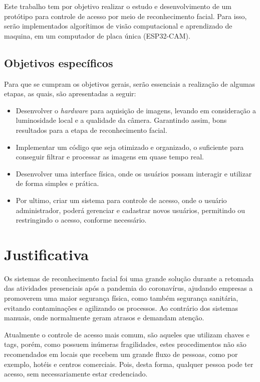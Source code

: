 Este trabalho tem por objetivo realizar o estudo e desenvolvimento de um protótipo 
para controle de acesso por meio de reconhecimento facial. Para isso, serão implementados 
algorítimos de visão computacional e aprendizado de maquina, em um computador de placa 
única (ESP32-CAM).

\subsection{Objetivos específicos}\label{subsec:objetivosEspecificos}

Para que se cumpram os objetivos gerais, serão essenciais a realização de algumas etapas, 
as quais, são apresentadas a seguir:

\begin{itemize}
    \item  Desenvolver o \textit{hardware} para aquisição de imagens, levando em 
    consideração a luminosidade local e a qualidade da câmera. Garantindo assim, 
    bons resultados para a etapa de reconhecimento facial.
  
    \item Implementar um código que seja otimizado e organizado, o suficiente para 
    conseguir filtrar e processar as imagens em quase tempo real. 
    
    \item Desenvolver uma interface física, onde os usuários possam interagir e 
    utilizar de forma simples e prática.
    
    \item Por ultimo, criar um sistema para controle de acesso, onde o usuário 
    administrador, poderá gerenciar e cadastrar novos usuários, permitindo ou 
    restringindo o acesso, conforme necessário. 
\end{itemize}

\section{Justificativa}\label{sec:justificativa}

Os sistemas de reconhecimento facial foi uma grande solução durante a retomada 
das atividades presenciais após a pandemia do coronavírus, ajudando empresas
a promoverem uma maior segurança física, como também segurança sanitária, 
evitando contaminações e agilizando os processos. Ao contrário dos sistemas 
manuais, onde normalmente geram atrasos e demandam atenção.

Atualmente o controle de acesso mais comum, são aqueles que utilizam chaves 
e tags, porém, como possuem inúmeras fragilidades, estes procedimentos não são 
recomendados em locais que recebem um grande fluxo de pessoas, como por exemplo, 
hotéis e centros comerciais. Pois, desta forma, qualquer pessoa pode ter acesso, 
sem necessariamente estar credenciado.

